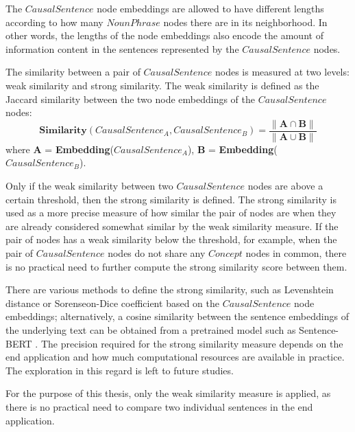 \documentclass [
     12pt,         %
     a4paper,      %
     BCOR10mm,     %
     DIV14,        %
     liststotoc,   %
     bibtotoc,     %
     idxtotoc,     %
     parskip       %
     ]{scrreprt}
\begin{document}
The $CausalSentence$ node embeddings are allowed to have different lengths according to how many $NounPhrase$ nodes there are in its neighborhood. In other words, the lengths of the node embeddings also encode the amount of information content in the sentences represented by the $CausalSentence$ nodes. 

The similarity between a pair of $CausalSentence$ nodes is measured at two levels: weak similarity and strong similarity. The weak similarity is defined as the Jaccard similarity between the two node embeddings of the $CausalSentence$ nodes:
\[ \mathbf{Similarity}(CausalSentence_A, CausalSentence_B) = \frac{\| \mathbf{A \cap B} \|}{\|\mathbf{A \cup B} \|} \]  
where $\mathbf{A}$ = \textbf{Embedding}($CausalSentence_A$), $\mathbf{B}$ = \textbf{Embedding}($CausalSentence_B$).

Only if the weak similarity between two $CausalSentence$ nodes are above a certain threshold, then the strong similarity is defined. The strong similarity is used as a more precise measure of how similar the pair of nodes are when they are already considered somewhat similar by the weak similarity measure. If the pair of nodes has a weak similarity below the threshold, for example, when the pair of $CausalSentence$ nodes do not share any $Concept$ nodes in common, there is no practical need to further compute the strong similarity score between them. 

There are various methods to define the strong similarity, such as Levenshtein distance \cite{similarity2020} or Sorenseon-Dice coefficient \cite{similarity2020} based on the $CausalSentence$ node embeddings; alternatively, a cosine similarity between the sentence embeddings of the underlying text can be obtained from a pretrained model such as Sentence-BERT \cite{sentenceBERT2019}. The precision required for the strong similarity measure depends on the end application and how much computational resources are available in practice. The exploration in this regard is left to future studies. 

For the purpose of this thesis, only the weak similarity measure is applied, as there is no practical need to compare two individual sentences in the end application. 


\end{document}
